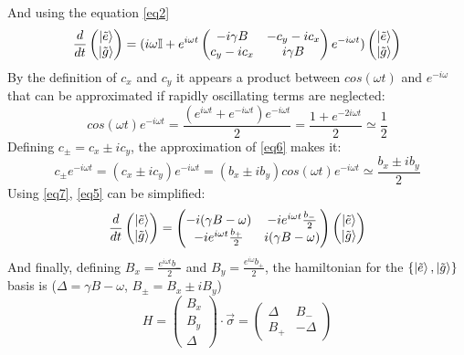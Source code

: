 \documentclass{article}
\begin{document}
And using the equation \ref{eq2}
\begin{equation}\label{eq5}\frac{d}{dt}\begin{pmatrix} \ket{\tilde{e}}\\ \ket{\tilde{g}} \end{pmatrix}= (i\omega \mathbb{I}+e^{i\omega t}\begin{pmatrix} -i\gamma B & -c_y-ic_x\\ c_y-ic_x & i\gamma B \end{pmatrix}
e^{-i\omega t})\begin{pmatrix} \ket{\tilde{e}}\\ \ket{\tilde{g}} \end{pmatrix}\end{equation}
By the definition of $c_x$ and $c_y$ it appears a product between $cos(\omega t)$ and $e^{-i\omega}$ that can be approximated if rapidly oscillating terms are neglected:
\begin{equation}\label{eq6}cos(\omega t)e^{-i\omega t}=\frac{(e^{i\omega t}+e^{-i\omega t})e^{-i\omega t}}{2}=\frac{1+e^{-2i\omega t}}{2}\simeq \frac{1}{2}\end{equation}
Defining $c_\pm=c_x\pm ic_y$, the approximation of \ref{eq6} makes it:
\begin{equation}\label{eq7}c_\pm e^{-i\omega t}=(c_x\pm ic_y)e^{-i\omega t}=(b_x\pm ib_y)cos(\omega t)e^{-i\omega t}\simeq \frac{b_x\pm  i b_y}{2}\end{equation}
Using \ref{eq7}, \ref{eq5} can be simplified:
\begin{equation}\label{eq8}\frac{d}{dt}\begin{pmatrix} \ket{\tilde{e}}\\ \ket{\tilde{g}} \end{pmatrix}= \begin{pmatrix} -i(\gamma B-\omega) & -ie^{i\omega t}\frac{b_-}{2}\\ -ie^{i\omega t}\frac{b_+}{2} & i(\gamma B-\omega) \end{pmatrix}\begin{pmatrix} \ket{\tilde{e}}\\ \ket{\tilde{g}} \end{pmatrix}\end{equation}
And finally, defining $B_x=\frac{e^{i\omega t}b_-}{2}$ and $B_y=\frac{e^{i\omega}b_+}{2}$, the hamiltonian for the $\{\ket{\tilde{e}},\ket{\tilde{g}}\}$ basis is ($\Delta=\gamma B-\omega$, $B_\pm=B_x\pm iB_y$)
\begin{equation}\label{eq9}H=\begin{pmatrix} B_x \\ B_y \\ \Delta \end{pmatrix}\cdot\vec{\sigma}=\begin{pmatrix}\Delta & B_- \\ B_+ & -\Delta \end{pmatrix}\end{equation}
\end{document}
